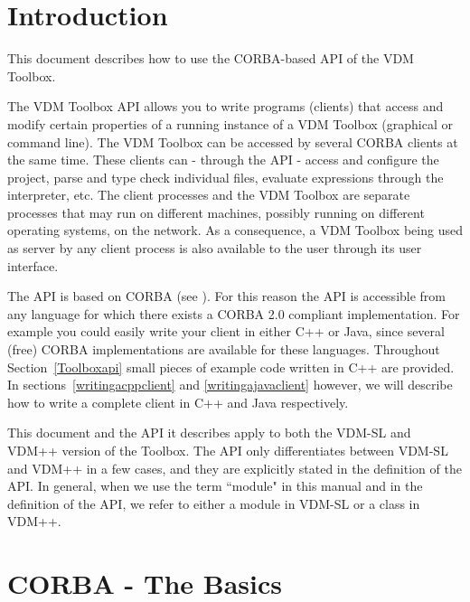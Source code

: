 \documentclass[\pformat,12pt]{article}
\begin{document}

\renewcommand{\thepage}{\roman{page}}

\label{endtofc}
\ifthenelse{\isodd{\pageref{endtofc}}}{\mbox{}\newpage}{}
\newpage 
\renewcommand{\thepage}{\arabic{page}}
\setcounter{page}{1}


\section{Introduction}
This document describes how to use the CORBA-based API of the VDM Toolbox. 

The VDM Toolbox API allows you to write programs (clients) that access
and modify certain properties of a running instance of a VDM
Toolbox (graphical or command line). The
VDM Toolbox can be accessed by several CORBA clients at the same time.
These clients can - through the API - access and configure the
project, parse and type check individual files, evaluate expressions
through the interpreter, etc. The client processes and the VDM Toolbox
are separate processes that may run on different machines, possibly
running on different operating systems, on the network. As a
consequence, a VDM Toolbox being used as server by any client process
is also available to the user through its user interface.

The API is based on CORBA (see \cite{OMG&96}). For this reason the API is
accessible from any language for which there exists a CORBA
2.0 compliant implementation. For example you could easily write your client in
either C++ or Java, since several (free) CORBA implementations are
available for these languages. Throughout Section~\ref{Toolboxapi}
small pieces of example code written in C++ are provided. In
sections~\ref{writingacppclient} and \ref{writingajavaclient} however,
we will describe how to write a complete client in C++ and Java
respectively. 

This document and the API it describes apply to both the VDM-SL and
VDM++ version of the Toolbox. The API only differentiates between
VDM-SL and VDM++ in a few cases, and they are explicitly stated in the
definition of the API. In general, when we use the term ``module" in
this manual and in the definition of the API, we refer to either a
module in VDM-SL or a class in VDM++.   

\newpage
\section{CORBA - The Basics}
\end{document}
